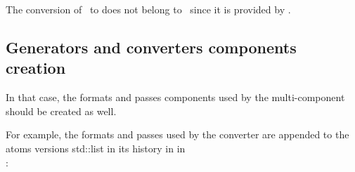 The conversion of \mxml\ to \mxsrRepr does not belong to \mf\, since it is provided by \libmusicxml.


\subsection{Generators and converters components creation}\label{Generators and converters components creation}

In that case, the formats and passes components used by the multi-component should be created as well.

For example, the formats and passes used by the  converter are appended to the atoms versions std::list in its history in  in \\
:
